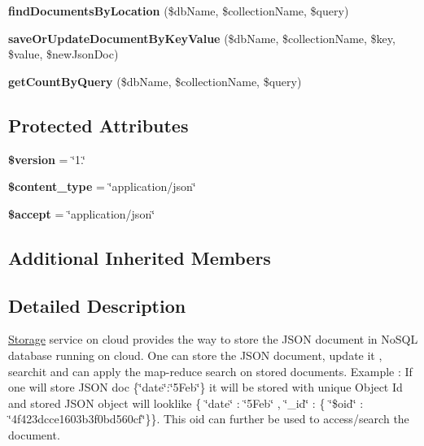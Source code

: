 \begin{DoxyCompactItemize}
\item 
\hypertarget{class_storage_service_aafcb85d5e08612078ac1ca3d74a1f2cf}{{\bfseries find\+Documents\+By\+Location} (\$db\+Name, \$collection\+Name, \$query)}\label{class_storage_service_aafcb85d5e08612078ac1ca3d74a1f2cf}

\item 
\hypertarget{class_storage_service_a12ca0f6e2ad987ce2803643075fd34b5}{{\bfseries save\+Or\+Update\+Document\+By\+Key\+Value} (\$db\+Name, \$collection\+Name, \$key, \$value, \$new\+Json\+Doc)}\label{class_storage_service_a12ca0f6e2ad987ce2803643075fd34b5}

\item 
\hypertarget{class_storage_service_a614349318d2bb2342d175189098910a4}{{\bfseries get\+Count\+By\+Query} (\$db\+Name, \$collection\+Name, \$query)}\label{class_storage_service_a614349318d2bb2342d175189098910a4}

\end{DoxyCompactItemize}
\subsection*{Protected Attributes}
\begin{DoxyCompactItemize}
\item 
\hypertarget{class_storage_service_a17c8948c68aa44fa9961ae169b6a8961}{{\bfseries \$version} = \char`\"{}1.\char`\"{}}\label{class_storage_service_a17c8948c68aa44fa9961ae169b6a8961}

\item 
\hypertarget{class_storage_service_ae754d6373f275e781f47c8bc9b994b6d}{{\bfseries \$content\+\_\+type} = \char`\"{}application/json\char`\"{}}\label{class_storage_service_ae754d6373f275e781f47c8bc9b994b6d}

\item 
\hypertarget{class_storage_service_a75fc18c4ff06288ff9fdf8aba9bd1081}{{\bfseries \$accept} = \char`\"{}application/json\char`\"{}}\label{class_storage_service_a75fc18c4ff06288ff9fdf8aba9bd1081}

\end{DoxyCompactItemize}
\subsection*{Additional Inherited Members}


\subsection{Detailed Description}
\hyperlink{class_storage}{Storage} service on cloud provides the way to store the J\+S\+O\+N document in No\+S\+Q\+L database running on cloud. One can store the J\+S\+O\+N document, update it , searchit and can apply the map-\/reduce search on stored documents. Example \+: If one will store J\+S\+O\+N doc \{\char`\"{}date\char`\"{}\+:\char`\"{}5\+Feb\char`\"{}\} it will be stored with unique Object Id and stored J\+S\+O\+N object will looklike \{ \char`\"{}date\char`\"{} \+: \char`\"{}5\+Feb\char`\"{} , \char`\"{}\+\_\+id\char`\"{} \+: \{ \char`\"{}\$oid\char`\"{} \+: \char`\"{}4f423dcce1603b3f0bd560cf\char`\"{}\}\}. This oid can further be used to access/search the document.

